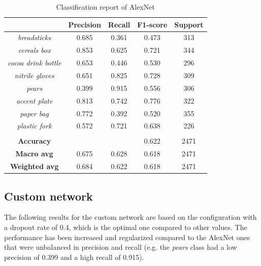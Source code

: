 \documentclass[11pt]{article}
\begin{document}
   \begin{table}[H]
		\centering	
		\begin{tabular}{c|c|c|c|c}
			\hline
			& \textbf{Precision} & \textbf{Recall} & \textbf{F1-score} & \textbf{Support} \\
			\hline
			\textit{breadsticks} & 0.685 & 0.361 & 0.473 & 313 \\
			\textit{cereals box} & 0.853 & 0.625 & 0.721 & 344 \\
			\textit{cocoa drink bottle} & 0.653 & 0.446 & 0.530 & 296 \\
			\textit{nitrile gloves} & 0.651 & 0.825 & 0.728 & 309 \\
			\textit{pears} & 0.399 & 0.915 & 0.556 & 306 \\
			\textit{accent plate} & 0.813 & 0.742 & 0.776 & 322 \\
			\textit{paper bag} & 0.772 & 0.392 & 0.520 & 355 \\
			\textit{plastic fork} & 0.572 & 0.721 & 0.638 & 226 \\
			\hline
			\multicolumn{5}{c}{} \\
			\hline
			\textbf{Accuracy} & & & 0.622 & 2471 \\
			\textbf{Macro avg} & 0.675 & 0.628 & 0.618 & 2471 \\
			\textbf{Weighted avg} & 0.684 & 0.622 & 0.618 & 2471 \\
			\hline
		\end{tabular}
		\caption{Classification report of AlexNet}
	\end{table}


	\subsection{Custom network}
	The following results for the custom network are based on the configuration
	with a dropout rate of 0.4, which is the optimal one compared to other values.
	The performance has been increased and regularized compared to the AlexNet ones
	that were unbalanced in precision and recall (e.g. the \textit{pears} class
	had a low precision of 0.399 and a high recall of 0.915).
\end{document}
